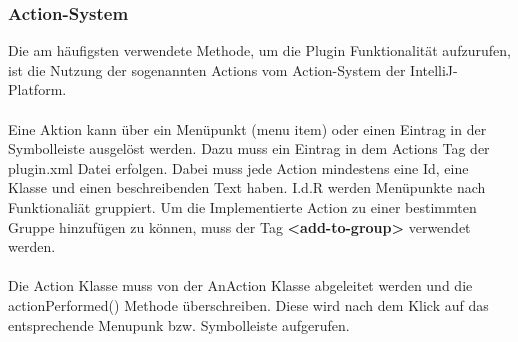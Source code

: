 	\subsubsection*{Action-System}
	Die am häufigsten verwendete Methode, um die Plugin Funktionalität aufzurufen, ist die Nutzung der sogenannten Actions vom Action-System der IntelliJ-Platform.\\ \\
	Eine Aktion kann über ein Menüpunkt (menu item) oder einen Eintrag in der Symbolleiste ausgelöst werden. Dazu muss ein Eintrag in dem Actions Tag der plugin.xml Datei erfolgen. Dabei muss jede Action mindestens eine Id, eine Klasse und einen beschreibenden Text haben. I.d.R werden Menüpunkte nach Funktionaliät gruppiert. Um die Implementierte Action zu einer bestimmten Gruppe hinzufügen zu können, muss der Tag \textbf{<add-to-group>} verwendet werden.\\ \\
	Die Action Klasse muss von der AnAction Klasse abgeleitet werden und die actionPerformed() Methode überschreiben. Diese wird nach dem Klick auf das entsprechende Menupunk bzw. Symbolleiste aufgerufen.
	
	
	
	
	
	
